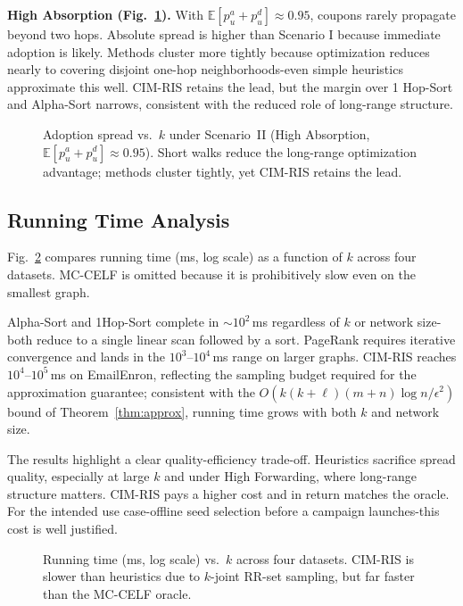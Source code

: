 \documentclass[sigconf]{acmart}
\newcommand{\CIMRIS}{\textsc{CIM-RIS}}
\newcommand{\E}{\mathbb{E}}
\begin{document}
\textbf{High Absorption (Fig.~\ref{fig:high_abs}).}
With $\E[p_u^a + p_u^d] \approx 0.95$, coupons rarely propagate beyond
two hops.
Absolute spread is higher than Scenario I because immediate adoption is
likely.
Methods cluster more tightly because optimization reduces nearly to
covering disjoint one-hop neighborhoods-even simple heuristics
approximate this well.
\CIMRIS{} retains the lead, but the margin over 1 Hop-Sort and Alpha-Sort
narrows, consistent with the reduced role of long-range structure.

\begin{figure}[t]
  \centering
  \caption{Adoption spread vs.\ $k$ under Scenario~II (High
    Absorption, $\E[p_u^a + p_u^d] \approx 0.95$).
    Short walks reduce the long-range optimization advantage; methods
    cluster tightly, yet \CIMRIS{} retains the lead.}
  \label{fig:high_abs}
\end{figure}

\subsection{Running Time Analysis}
\label{sec:exp-runtime}

Fig.~\ref{fig:runtime} compares running time (ms, log scale) as a
function of $k$ across four datasets.
MC-CELF is omitted because it is prohibitively slow even on the
smallest graph.

Alpha-Sort and 1Hop-Sort complete in ${\sim}10^2$\,ms regardless of
$k$ or network size-both reduce to a single linear scan followed by
a sort.
PageRank requires iterative convergence and lands in the
$10^3$--$10^4$\,ms range on larger graphs.
\CIMRIS{} reaches $10^4$--$10^5$\,ms on EmailEnron, reflecting the
sampling budget required for the approximation guarantee; consistent
with the $O(k(k+\ell)(m+n)\log n/\epsilon^2)$ bound of
Theorem~\ref{thm:approx}, running time grows with both $k$ and
network size.

The results highlight a clear quality-efficiency trade-off.
Heuristics sacrifice spread quality, especially at large $k$ and under
High Forwarding, where long-range structure matters.
\CIMRIS{} pays a higher cost and in return matches the oracle.
For the intended use case-offline seed selection before a campaign
launches-this cost is well justified.

\begin{figure}[t]
  \centering
  \caption{Running time (ms, log scale) vs.\ $k$ across four datasets.
    \CIMRIS{} is slower than heuristics due to $k$-joint RR-set
    sampling, but far faster than the MC-CELF oracle.}
  \label{fig:runtime}
\end{figure}
\end{document}
